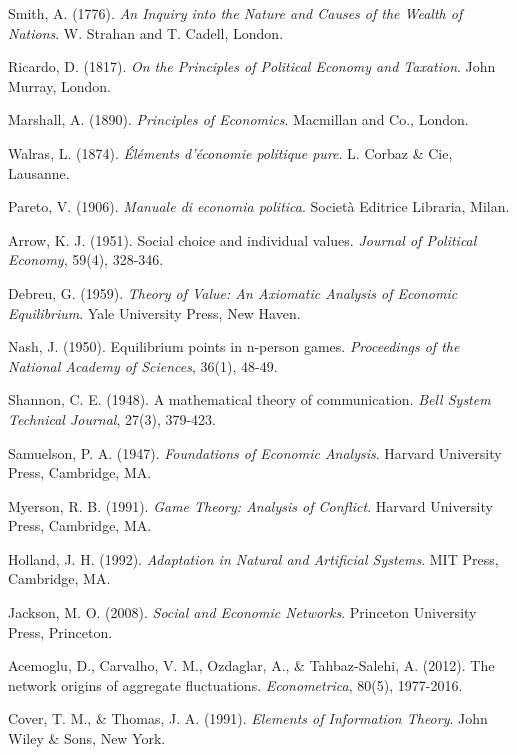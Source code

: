 \documentclass[12pt,a4paper]{article}
\begin{document}

\begin{thebibliography}{99}

 Smith, A. (1776). \textit{An Inquiry into the Nature and Causes of the Wealth of Nations}. W. Strahan and T. Cadell, London.

 Ricardo, D. (1817). \textit{On the Principles of Political Economy and Taxation}. John Murray, London.

 Marshall, A. (1890). \textit{Principles of Economics}. Macmillan and Co., London.

 Walras, L. (1874). \textit{Éléments d'économie politique pure}. L. Corbaz \& Cie, Lausanne.

 Pareto, V. (1906). \textit{Manuale di economia politica}. Società Editrice Libraria, Milan.

 Arrow, K. J. (1951). Social choice and individual values. \textit{Journal of Political Economy}, 59(4), 328-346.

 Debreu, G. (1959). \textit{Theory of Value: An Axiomatic Analysis of Economic Equilibrium}. Yale University Press, New Haven.

 Nash, J. (1950). Equilibrium points in n-person games. \textit{Proceedings of the National Academy of Sciences}, 36(1), 48-49.

 Shannon, C. E. (1948). A mathematical theory of communication. \textit{Bell System Technical Journal}, 27(3), 379-423.

 Samuelson, P. A. (1947). \textit{Foundations of Economic Analysis}. Harvard University Press, Cambridge, MA.

 Myerson, R. B. (1991). \textit{Game Theory: Analysis of Conflict}. Harvard University Press, Cambridge, MA.

 Holland, J. H. (1992). \textit{Adaptation in Natural and Artificial Systems}. MIT Press, Cambridge, MA.

 Jackson, M. O. (2008). \textit{Social and Economic Networks}. Princeton University Press, Princeton.

 Acemoglu, D., Carvalho, V. M., Ozdaglar, A., \& Tahbaz-Salehi, A. (2012). The network origins of aggregate fluctuations. \textit{Econometrica}, 80(5), 1977-2016.

 Cover, T. M., \& Thomas, J. A. (1991). \textit{Elements of Information Theory}. John Wiley \& Sons, New York.


\end{thebibliography}
\end{document}
